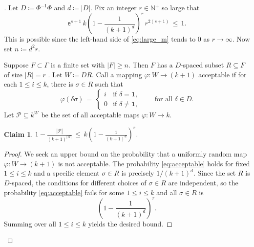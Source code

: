 \documentclass[11pt,reqno,psamsfonts]{amsart}
\theoremstyle{bfnote}
\newtheorem{claim}[theo]{Claim}
\theoremstyle{definition}
\theoremstyle{remark}
\newcommand*{\myproofname}{Proof}
\newenvironment{claimproof}[1][\myproofname]{\begin{proof}[#1]\renewcommand*{\qedsymbol}{\(\boxtimes\)}}{\end{proof}}
\renewcommand{\qedsymbol}{$\blacksquare$}
\newcommand{\0}{\varnothing}
\newcommand{\set}[1]{\{#1\}}
\renewcommand{\phi}{\varphi}
\renewcommand{\leq}{\leqslant}
\renewcommand{\geq}{\geqslant}
\newcommand{\defeq}{\coloneqq}
\newcommand{\emphd}[1]{{\fontseries{b}\selectfont\textsf{#1}}}
\newcommand{\G}{\Gamma}
\newcommand{\N}{\mathbb{N}}
\newcommand{\iden}{\mathbf{1}}
\numberwithin{equation}{section}
\newenvironment{scproof}[1][]{\begin{proof}[\textsc{\upshape{Proof}}#1]}{\end{proof}}
\begin{document}
    \begin{scproof}
        Let $D \defeq \Phi^{-1}\Phi$ and $d \defeq |D|$. Fix an integer $r \in \N^+$ so large that
        \begin{equation}\label{eq:large_m}
            \mathsf{e}^{s+1} \, k \left(1 - \frac{1}{(k+1)^d}\right)^r \, r^{2(s+1)} \,\leq\, 1.
        \end{equation}
        This is possible since the left-hand side of \eqref{eq:large_m} tends to $0$ as $r \to \infty$. Now set $n \defeq d^2 r$.

        Suppose $F \subset \G$ is a finite set with $|F| \geq n$. Then $F$ has a $D$-spaced subset $R \subseteq F$ of size $|R| = r$ \cite[Lem.~4.1]{LLLDyn3}. 
        Let $W \defeq DR$. Call a mapping $\phi \colon W \to (k+1)$ \emphd{acceptable} if for each $1 \leq i \leq k$, there is $\sigma \in R$ such that
        \begin{equation}\label{eq:acceptable}
            \phi(\delta \sigma) \,=\, \begin{cases}
                i &\text{if } \delta = \iden,\\
                0 &\text{if } \delta \neq \iden,
            \end{cases} \qquad \text{for all }\delta \in D.
        \end{equation}
        Let $\mathcal{P} \subseteq k^W$ be the set of all acceptable maps $\phi \colon W \to k$.

        \begin{claim}\label{claim:bound_on_prob}
            $\displaystyle 1 - \frac{|\mathcal{P}|}{(k+1)^{|W|}} \,\leq\, k \left(1 - \frac{1}{(k+1)^d}\right)^r$.
        \end{claim}
        \begin{claimproof}
            We seek an upper bound on the probability that a uniformly random map $\phi \colon W \to (k+1)$ is not acceptable. %
            The probability \eqref{eq:acceptable} holds for fixed $1 \leq i \leq k$ and a specific element $\sigma \in R$ is precisely $1/(k+1)^d$. Since the set $R$ is $D$-spaced, the conditions for different choices of $\sigma \in R$ are independent, so the probability \eqref{eq:acceptable} fails for some $1 \leq i \leq k$ and all $\sigma \in R$ is
            \[
                \left(1 - \frac{1}{(k+1)^d}\right)^r.
            \]
            Summing over all $1 \leq i \leq k$ yields the desired bound.
        \end{claimproof}


\end{scproof}
\end{document}
